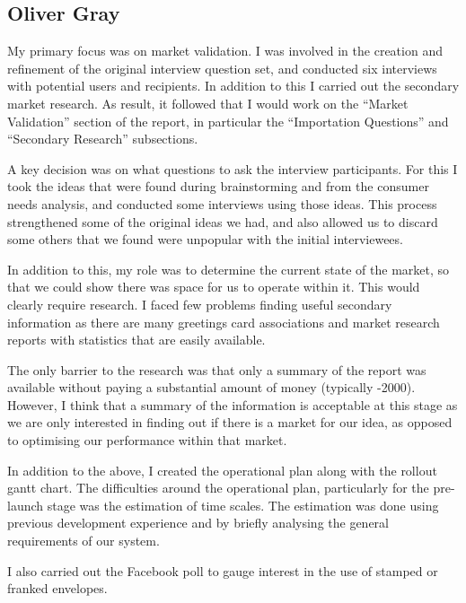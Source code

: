 \documentclass[10pt,a4paper]{article}
\begin{document}
\begin{appendices}
\clearpage
\subsection{Oliver Gray}\label{subsec:oliverGray}
My primary focus was on market validation. I was involved in the creation and refinement of the original interview question set, and conducted six interviews with potential users and recipients. In addition to this I carried out the secondary market research. As result, it followed that I would work on the ``Market Validation'' section of the report, in particular the ``Importation Questions'' and ``Secondary Research'' subsections.

A key decision was on what questions to ask the interview participants. For this I took the ideas that were found during brainstorming and from the consumer needs analysis, and conducted some interviews using those ideas. This process strengthened some of the original ideas we had, and also allowed us to discard some others that we found were unpopular with the initial interviewees.

In addition to this, my role was to determine the current state of the market, so that we could show there was space for us to operate within it. This would clearly require research. I faced few problems finding useful secondary information as there are many greetings card associations and market research reports with statistics that are easily available.

The only barrier to the research was that only a summary of the report was available without paying a substantial amount of money (typically -2000). However, I think that a summary of the information is acceptable at this stage as we are only interested in finding out if there is a market for our idea, as opposed to optimising our performance within that market.

In addition to the above, I created the operational plan along with the rollout gantt chart. The difficulties around the operational plan, particularly for the pre-launch stage was the estimation of time scales. The estimation was done using previous development experience and by briefly analysing the general requirements of our system.

I also carried out the Facebook poll to gauge interest in the use of stamped or franked envelopes.

\clearpage

\end{appendices}
\end{document}
